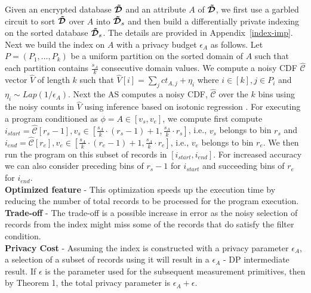 Given an encrypted database $\boldsymbol{\tilde{\mathcal{D}}}$ and an attribute $A$ of $\boldsymbol{\tilde{\mathcal{D}}}$, we first use a garbled circuit to sort $\boldsymbol{\tilde{\mathcal{D}}}$ over $A$ into $\boldsymbol{\tilde{\mathcal{D}}}_s$ and then build a differentially private indexing on the sorted database $\boldsymbol{\tilde{\mathcal{D}}}_s$. The details are provided in Appendix~\ref{index-imp}. Next we build the index on $A$ with a privacy budget $\epsilon_{A}$ as follows. Let $P=(P_1,\ldots,P_k)$ be a uniform partition on the sorted domain of $A$ such that each partition contains $\frac{s_A}{k}$ consecutive domain values. We compute a noisy CDF $\hat{\mathcal{C}}$ vector $\hat{V}$ of length $k$ such that $\hat{V}[i]=\sum_j ct_{A,j}+\eta_i$ where $i \in [k], j \in P_i$ and $\eta_i\sim Lap(1/\epsilon_A)$. 
Next the \textsf{AS} computes a noisy CDF, $\hat{\mathcal{C}}$ over the $k$ bins using the noisy counts in $\hat{V}$ using inference based on isotonic regression \cite{cdf}. For executing a program conditioned as $\phi=A \in [v_s,v_e]$, we compute first compute $i_{start}=\hat{\mathcal{C}}[r_s-1], v_s \in [\frac{s_A}{k}\cdot(r_s-1)+1,\frac{s_A}{k}\cdot r_s]$, i.e., $v_s$ belongs to bin $r_s$   and  $i_{end}=\hat{\mathcal{C}}[r_e], v_e \in [\frac{s_A}{k}\cdot(r_e-1)+1,\frac{s_A}{k}\cdot r_e]$, i.e., $v_e$ belongs to bin $r_e$. We then run the program on this subset of records in $[i_{start},i_{end}]$. For increased accuracy we can also consider preceding bins of $r_s-1$ for $i_{start}$ and succeeding bins of $r_e$ for $i_{end}$.\\
\textbf{Optimized feature} - This optimization speeds up the execution time by reducing the number of total records to be processed for the program execution.\\
\textbf{Trade-off} - The trade-off is  a possible increase in error as the noisy selection of records from the index might miss some of the records that do satisfy the filter condition.\\
\textbf{Privacy Cost} - Assuming the index is constructed with a privacy parameter $\epsilon_A$, a selection of a subset of records using it will result in a $\epsilon_A$ - DP intermediate result. If $\epsilon$ is the parameter used for the subsequent measurement primitives, then by Theorem 1, the total privacy parameter is $\epsilon_A+\epsilon$.\\
